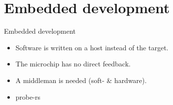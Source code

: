\documentclass[aspectratio=1610,14pt,t]{beamer}
\begin{document}
\section{Embedded development}

\begin{frame}[c]{Embedded development}
  \begin{itemize}
    \item Software is written on a host instead of the target.
    \item The microchip has no direct feedback.
    \item A middleman is needed (soft- \& hardware).
    \item probe-rs
  \end{itemize}
\end{frame}
\end{document}
